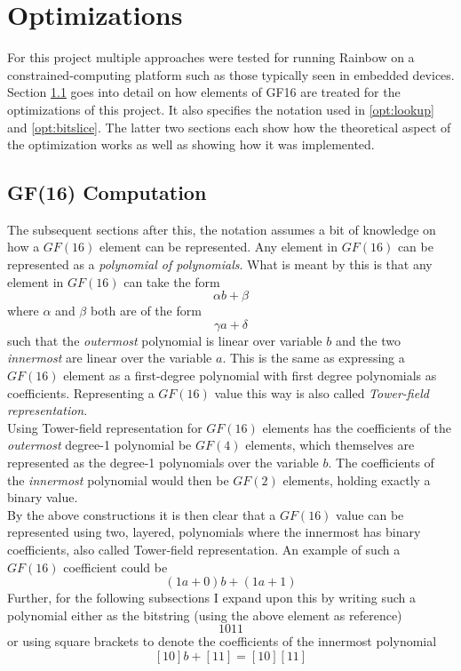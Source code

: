 \section{Optimizations} \label{opti}
For this project multiple approaches were tested for running Rainbow on a constrained-computing platform such as those typically seen in embedded devices. Section \ref{opt:gf16comp} goes into detail on how elements of GF16 are treated for the optimizations of this project. It also specifies the notation used in \cref{opt:lookup} and \cref{opt:bitslice}. The latter two sections each show how the theoretical aspect of the optimization works as well as showing how it was implemented.
\subsection{GF(16) Computation} \label{opt:gf16comp}
The subsequent sections after this, the notation assumes a bit of knowledge on how a $GF(16)$ element can be represented. Any element in $GF(16)$ can be represented as a \emph{polynomial of polynomials}. What is meant by this is that any element in $GF(16)$ can take the form
$$
    \alpha b + \beta
$$
where $\alpha$ and $\beta$ both are of the form 
$$
    \gamma a + \delta
$$
such that the \emph{outermost} polynomial is linear over variable $b$ and the two \emph{innermost} are linear over the variable $a$. This is the same as expressing a $GF(16)$ element as a first-degree polynomial with first degree polynomials as coefficients. Representing a $GF(16)$ value this way is also called \emph{Tower-field representation}.
\medskip\\
Using Tower-field representation for $GF(16)$ elements has the coefficients of the \emph{outermost} degree-1 polynomial be $GF(4)$ elements, which themselves are represented as the degree-1 polynomials over the variable $b$. The coefficients of the \emph{innermost} polynomial would then be $GF(2)$ elements, holding exactly a binary value.
\medskip\\
By the above constructions it is then clear that a $GF(16)$ value can be represented using two, layered, polynomials where the innermost has binary coefficients, also called Tower-field representation. An example of such a $GF(16)$ coefficient could be
$$
    (1a + 0) b + (1a + 1)
$$
Further, for the following subsections I expand upon this by writing such a polynomial either as the bitstring (using the above element as reference)
$$
    1011
$$
or using square brackets to denote the coefficients of the innermost polynomial
$$
    [10]b + [11] = [10][11]
$$
